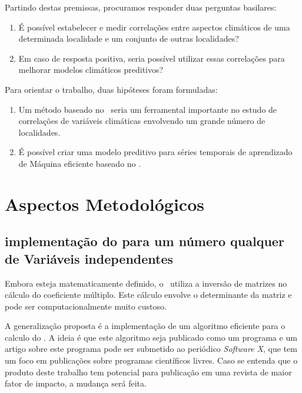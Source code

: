 Partindo destas premissas, procuramos responder duas perguntas basilares:

\begin{enumerate}
    \label{enum:quest}

    \item É possível estabelecer e medir correlações entre aspectos climáticos de uma determinada localidade e um conjunto de outras localidades?

    \item Em caso de resposta positiva, seria possível utilizar essas correlações para melhorar modelos climáticos preditivos?
\end{enumerate}

Para orientar o trabalho, duas hipóteses foram formuladas:

\begin{enumerate}
    \item Um método baseado no \dmc~seria um ferramental importante no estudo de correlações de variáveis climáticas envolvendo um grande número de localidades.
	\item É possível criar uma modelo preditivo para séries temporais de aprendizado de Máquina eficiente baseado no \dmc.
\end{enumerate}

\section{Aspectos Metodológicos}
\label{sec:metodologia}


\subsection{implementação do \dmc para um número qualquer de Variáveis independentes}

Embora esteja matematicamente definido, o \dmc~utiliza a inversão de matrizes no cálculo do coeficiente múltiplo. Este cálculo envolve o determinante da matriz e pode ser computacionalmente muito custoso.

A generalização proposta é a implementação de um algoritmo eficiente para o calculo do \dmc. A ideia é que este algoritmo seja publicado como um programa e um artigo sobre este programa pode ser submetido ao periódico \emph{Software X}, que tem um foco em publicações sobre programas científicos livres. Caso se entenda que o produto deste trabalho tem potencial para publicação em uma revista de maior fator de impacto, a mudança será feita.

